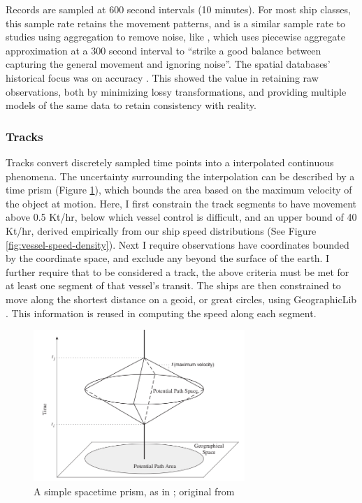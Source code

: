 \documentclass[12pt,letterpaper]{article}
\begin{document}
Records are sampled at 600 second intervals (10 minutes). For most ship classes, this sample rate retains the movement patterns, and is a similar sample rate to studies using aggregation to remove noise, like \citep{Vries2009}, which uses piecewise aggregate approximation at a 300 second interval to ``strike a good balance between capturing the general movement and ignoring noise''. %
The spatial databases' historical focus was on accuracy \citep{goodchild1989accuracy}. This showed the value in retaining raw observations, both by minimizing lossy transformations, and providing multiple models of the same data to retain consistency with reality.

\subsubsection{Tracks}

Tracks convert discretely sampled time points into a interpolated continuous phenomena. The uncertainty surrounding the interpolation can be described by a time prism (Figure \ref{fig:time-prism}), which bounds the area based on the maximum velocity of the object at motion. Here, I first constrain the track segments to have movement above 0.5 Kt/hr, below which vessel control is difficult, and an upper bound of 40 Kt/hr, derived empirically from our ship speed distributions (See Figure \ref{fig:vessel-speed-density}). Next I require observations have coordinates bounded by the coordinate space, and exclude %
any beyond the surface of the earth. I further require that to be considered a track, the above criteria must be met for at least one segment of that vessel's transit. The ships are then constrained to move along the shortest distance on a geoid, or great circles, using GeographicLib \citep{karney2012algorithms}. This information is reused in computing the speed along each segment. %

\begin{figure}[h!]
  \centering
    \includegraphics[width=80mm]{images/measurement-theory-for-time-geography-prism.png}
  \caption {A simple space{\textendash}time prism, as in \citep{Miller2005}; original from \citep{Wu2002}}
  \label{fig:time-prism}
\end{figure}
\end{document}
